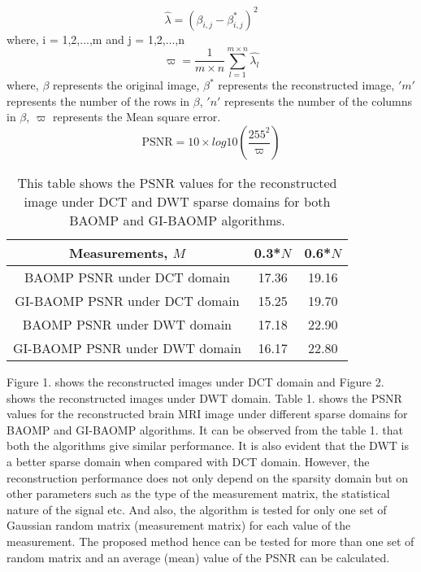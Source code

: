 \documentclass[11pt,conference]{IEEEtran}
\begin{document}
\begin{equation}
 \hat{\lambda} = (\beta_{i,j} - \beta^*_{i,j})^2 
\end{equation}
 where, i = 1,2,...,m 
 and j = 1,2,...,n
\begin{equation}
\varpi = \frac{1}{m\times n}{{\displaystyle\sum_{l=1}^{m\times n}{\hat{\lambda_l}}}}
\end{equation}
where, $\beta$ represents the original image, $\beta^*$ represents the reconstructed image, $'m'$ represents the number of the rows in $\beta$, $'n'$ represents the number of the columns in $\beta$, $\varpi$ represents the Mean square error.
\begin{equation}
 \text{PSNR} = 10 \times log10 (\frac{255^2}{\varpi})
\end{equation}

\begin{table}
\begin{center}
\begin{tabular} {|c|c|c|}
\hline

 Measurements, $M$ & 0.3*$N$ & 0.6*$N$ \\
 \hline
 BAOMP PSNR under DCT domain & 17.36 & 19.16 \\
 \hline
 GI-BAOMP PSNR under DCT domain & 15.25 & 19.70 \\
 \hline
 BAOMP PSNR under DWT domain & 17.18 & 22.90 \\
 \hline
 GI-BAOMP PSNR under DWT domain & 16.17 & 22.80 \\
 \hline
 \end{tabular}
\caption {This table shows the PSNR values for the reconstructed image under DCT and DWT sparse domains for both BAOMP and GI-BAOMP algorithms.}
\end{center}
\end{table}

\par Figure 1. shows the reconstructed images under DCT domain and Figure 2. shows the reconstructed images under DWT domain. Table 1. shows the PSNR values for the reconstructed brain MRI image under different sparse domains for BAOMP and GI-BAOMP algorithms. It can be observed from the table 1. that both the algorithms give similar performance. It is also evident that the DWT is a better sparse domain when compared with DCT domain. However, the reconstruction performance does not only depend on the sparsity domain but on other parameters such as the type of the measurement matrix, the statistical nature of the signal etc. And also, the algorithm is tested for only one set of Gaussian random matrix (measurement matrix) for each value of the measurement. The proposed method hence can be tested for more than one set of random matrix and an average (mean) value of the PSNR can be calculated.  
\end{document}
